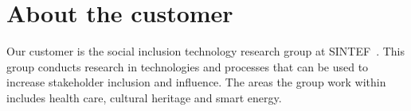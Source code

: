 \section{About the customer}

Our customer is the social inclusion technology research group at SINTEF~\cite{sintef}.
This group conducts research in technologies and processes that can be used to increase stakeholder inclusion and influence. The areas the group work within includes health care, cultural heritage and smart energy. 